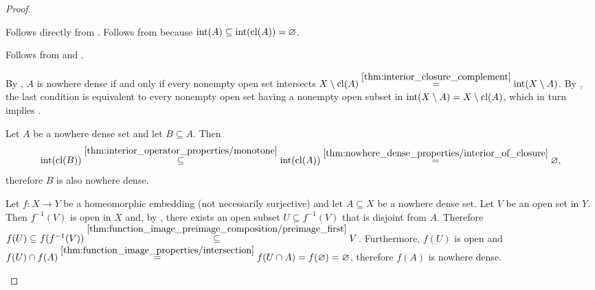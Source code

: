\begin{proof}\mbox{}
  \begin{description}
     Follows directly from .
     Follows from  because \( \operatorname{int}(A) \subseteq \operatorname{int}(\operatorname{cl}(A)) = \varnothing \).

     Follows from  and .

     By , \( A \) is nowhere dense if and only if every nonempty open set intersects \( X \setminus \operatorname{cl}(A) \overset {\ref{thm:interior_closure_complement}} = \operatorname{int}(X \setminus A) \). By , the last condition is equivalent to every nonempty open set having a nonempty open subset in \( \operatorname{int}(X \setminus A) = X \setminus \operatorname{cl}(A) \), which in turn implies .

     Let \( A \) be a nowhere dense set and let \( B \subseteq A \). Then
    \begin{equation*}
      \operatorname{int}(\operatorname{cl}(B))
      \overset {\ref{thm:interior_operator_properties/monotone}} \subseteq
      \operatorname{int}(\operatorname{cl}(A))
      \overset {\ref{thm:nowhere_dense_properties/interior_of_closure}} =
      \varnothing,
    \end{equation*}
    therefore \( B \) is also nowhere dense.

     Let \( f: X \to Y \) be a homeomorphic embedding (not necessarily surjective) and let \( A \subseteq X \) be a nowhere dense set. Let \( V \) be an open set in \( Y \). Then \( f^{-1}(V) \) is open in \( X \) and, by , there exists an open subset \( U \subseteq f^{-1}(V) \) that is disjoint from \( A \). Therefore \( f(U) \subseteq f(f^{-1}(V)) \overset {\ref{thm:function_image_preimage_composition/preimage_first}} \subseteq V \). Furthermore, \( f(U) \) is open and \( f(U) \cap f(A) \overset {\ref{thm:function_image_properties/intersection}} = f(U \cap A) = f(\varnothing) = \varnothing \), therefore \( f(A) \) is nowhere dense.


\end{description}
\end{proof}
